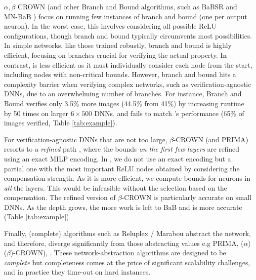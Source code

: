 $\alpha,\beta$ CROWN \cite{crown} (and other Branch and Bound algorithms, such as BaBSR \cite{BaB} and MN-BaB \cite{ferrari2022complete})  focus on running few instances of branch and bound (one per output neuron). In the worst case, this involves considering all possible ReLU configurations, though branch and bound typically circumvents most possibilities. In simple networks, like those trained robustly, branch and bound is highly efficient, focusing on branches crucial for verifying the actual property. In contrast, {\CMP} is less efficient as it must individually consider each node from the start, including nodes with non-critical bounds. However, branch and bound hits a complexity barrier when verifying complex networks, such as verification-agnostic DNNs, due to an overwhelming number of branches. For instance, Branch and Bound verifies only 3.5\% more images (44.5\% from 41\%) by increasing runtime by 50 times on larger $6 \times 500$ DNNs, and fails to match {\CMP}'s performance (65\% of images verified, Table \ref{tab:example}). 


For verification-agnostic DNNs that are not too large,  $\beta$-CROWN (and PRIMA) resorts to a {\em refined} path \cite{MILP2}, where the bounds {\em on the first few layers} are refined using an exact MILP encoding. In {\CMP}, we do not use an exact encoding but a partial one with the most important ReLU nodes obtained by considering the compensation strength. As it is more efficient, we compute bounds for neurons in {\em all} the layers. This would be infeasible without the selection based on the compensation. The refined version of $\beta$-CROWN is particularly accurate on small DNNs. As the depth grows, the more work is left to BaB and \CMP is more accurate (Table \ref{tab:example}).

Finally, (complete) algorithms such as Reluplex / Marabou \cite{Reluplex,katz2019marabou}  abstract the network, and therefore,  diverge significantly from those abstracting values e.g PRIMA, ($\alpha$)($\beta$)-CROWN)\cite{prima,crown}, {\CMP}. These network-abstraction algorithms are designed to be {\em complete} but completeness comes at the price of significant scalability challenges, and in practice they time-out on hard instances.